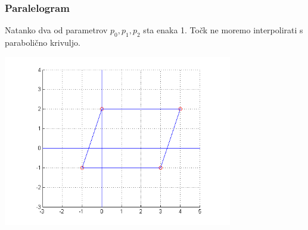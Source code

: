 \documentclass{beamer}
\begin{document}
\begin{frame}

\frametitle{Paralelogram}

Natanko dva od parametrov $p_0, p_1, p_2$ sta enaka 1. Točk ne moremo interpolirati s parabolično krivuljo.

\includegraphics[width=10cm]{para}

\end{frame}

\end{document}
